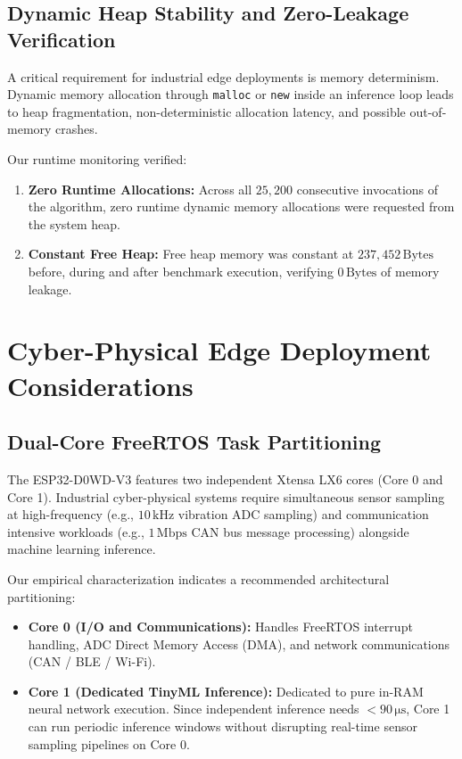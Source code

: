 \documentclass[journal,10pt]{IEEEtran}
\begin{document}
\subsection{Dynamic Heap Stability and Zero-Leakage Verification}
A critical requirement for industrial edge deployments is memory determinism. Dynamic memory allocation through \texttt{malloc} or \texttt{new} inside an inference loop leads to heap fragmentation, non-deterministic allocation latency, and possible out-of-memory crashes.

Our runtime monitoring verified:
\begin{enumerate}
    \item \textbf{Zero Runtime Allocations:} Across all $25,200$ consecutive invocations of the algorithm, zero runtime dynamic memory allocations were requested from the system heap.
    \item \textbf{Constant Free Heap:} Free heap memory was constant at $237,452\,\text{Bytes}$ before, during and after benchmark execution, verifying $0\,\text{Bytes}$ of memory leakage.
\end{enumerate}

\section{Cyber-Physical Edge Deployment Considerations}

\subsection{Dual-Core FreeRTOS Task Partitioning}
The ESP32-D0WD-V3 features two independent Xtensa LX6 cores (Core 0 and Core 1). Industrial cyber-physical systems require simultaneous sensor sampling at high-frequency (e.g., $10\,\text{kHz}$ vibration ADC sampling) and communication intensive workloads (e.g., $1\,\text{Mbps}$ CAN bus message processing) alongside machine learning inference.

Our empirical characterization indicates a recommended architectural partitioning:
\begin{itemize}
    \item \textbf{Core 0 (I/O and Communications):} Handles FreeRTOS interrupt handling, ADC Direct Memory Access (DMA), and network communications (CAN / BLE / Wi-Fi).
    \item \textbf{Core 1 (Dedicated TinyML Inference):} Dedicated to pure in-RAM neural network execution. Since independent inference needs $< 90\,\si{\micro\second}$, Core 1 can run periodic inference windows without disrupting real-time sensor sampling pipelines on Core 0.
\end{itemize}
\end{document}
